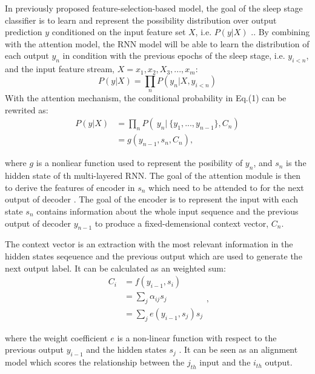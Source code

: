 \documentclass[journal]{IEEEtran}
\begin{document}
In previously proposed feature-selection-based model, the goal of the sleep stage classifier is to learn and represent the possibility distribution over output prediction $y$ conditioned on the input feature set $X$, i.e. $P(y|X)$ \cite{prabhavalkar2017analysis}.. By combining with the attention model, the RNN model will be able to learn the distribution of each output $y_n$ in condition with the previous epochs of the sleep stage, i.e. $y_{i<n}$, and the input feature stream, $X = {x_1, x_2, X_3, ..., x_m}$:
\begin{equation}
P(y|X) = \prod_n P(y_n|X,y_{i<n})
\end{equation}
With the attention mechanism, the conditional probability in Eq.(1) can be rewrited as:
\begin{equation}
\begin{aligned}
P(y|X) &= \prod_n P(\ y_n|\ \{y_1, ..., y_{n-1}\},C_n)\\
&= g(y_{n-1}, s_n, C_n),
\end{aligned}
\end{equation}

where $g$ is a nonliear function used to represent the posibility of $y_n$, and $s_n$ is the hidden state of th multi-layered RNN. The goal of the attention module is then to derive the features of encoder in $s_n$ which need to be attended to for the next output of decoder \cite{prabhavalkar2017analysis}. The goal of the encoder is to represent the input with each state $s_n$ contains information about the whole input sequence and the previous output of decoder $y_{n-1}$ to produce a fixed-demensional context vector, $C_n$. 

The context vector is an extraction with the most relevant information in the hidden states seqeuence and the previous output which are used to generate the next output label. It can be calculated as an weighted sum:
\begin{equation}
\begin{aligned}
C_i &= f(y_{i-1}, s_i)\\
&=\sum_j \alpha_{ij}s_j\\
&= \sum_j e(y_{i-1},s_j)s_j
\end{aligned},
\end{equation}

where the weight coefficient $e$ is a non-linear function with respect to the previous output $y_{i-1}$ and the hidden states $s_j$ \cite{bahdanau2014neural}. It can be seen as an alignment model which scores the relationship between the $j_{th}$ input and the $i_{th}$ output.
\end{document}
